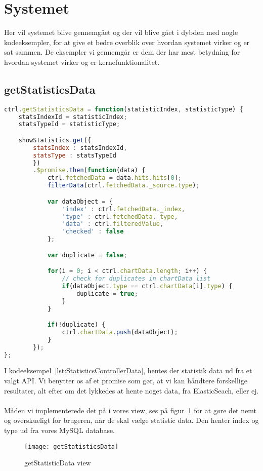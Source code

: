 \section{Systemet}
Her vil systemet blive gennemgået og der vil blive gået i dybden med nogle kodeeksempler, for at give et bedre overblik over hvordan systemet virker og er sat sammen.
De eksempler vi gennemgår er dem der har mest betydning for hvordan systemet virker og er kernefunktionalitet.
\subsection{getStatisticsData}
\begin{lstlisting}[caption={getStatisticsData}, language={JavaScript}, label={lst:StatisticsControllerData}]
ctrl.getStatisticsData = function(statisticIndex, statisticType) {
    statsIndexId = statisticIndex;
    statsTypeId = statisticType;

    showStatistics.get({
        statsIndex : statsIndexId,
        statsType : statsTypeId
        })
        .$promise.then(function(data) {
            ctrl.fetchedData = data.hits.hits[0];
            filterData(ctrl.fetchedData._source.type);

            var dataObject = {
                'index' : ctrl.fetchedData._index,
                'type' : ctrl.fetchedData._type,
                'data' : ctrl.filteredValue,
                'checked' : false
            };

            var duplicate = false;

            for(i = 0; i < ctrl.chartData.length; i++) {
                // check for duplicates in chartData list
                if(dataObject.type == ctrl.chartData[i].type) {
                    duplicate = true;
                }
            }

            if(!duplicate) {
                ctrl.chartData.push(dataObject);
            }
        });
};
\end{lstlisting}
I kodeeksempel~\ref{lst:StatisticsControllerData}, hentes der statistik data ud fra et valgt API.
Vi benytter os af et promise som gør, at vi kan håndtere forskellige resultater, alt efter om det lykkedes at hente noget data, fra ElasticSeach, eller ej.
\\\\
Måden vi implementerede det på i vores view, ses på figur~\ref{fig:getStatisticsData} for at gøre det nemt og overskueligt for brugeren,
når de skal vælge statistic data.
Den henter index og type ud fra vores MySQL database.
\begin{figure}[H]
\texttt{[image: getStatisticsData]}
\caption{getStatisticData view}
\label{fig:getStatisticsData}
\end{figure}
